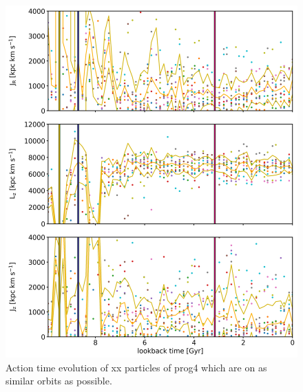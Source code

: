 \begin{figure}[htbp]
\captionsetup{format=plain}
    \centering
	\includegraphics[width=\textwidth]{plots/Dynamics/prog4/action_time_evolution_box_hist_mean_prog4.png}
    \caption{Action time evolution of xx particles of prog4 which are on as similar orbits as possible. }\label{fig:actions_box_time_evolution_prog4}
\end{figure}
\fi

